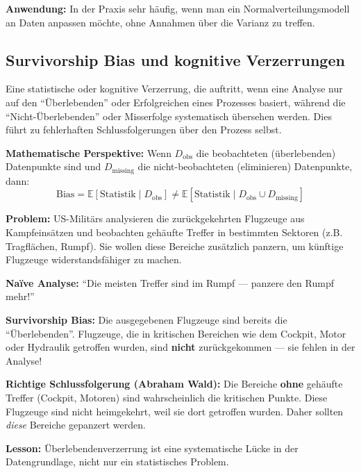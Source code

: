 \textbf{Anwendung:} In der Praxis sehr häufig, wenn man ein Normalverteilungsmodell an Daten anpassen möchte, ohne Annahmen über die Varianz zu treffen.

\newpage




\subsection{Survivorship Bias und kognitive Verzerrungen}

Eine statistische oder kognitive Verzerrung, die auftritt, wenn eine Analyse nur auf den ``Überlebenden'' oder Erfolgreichen eines Prozesses basiert, während die ``Nicht-Überlebenden'' oder Misserfolge systematisch übersehen werden. Dies führt zu fehlerhaften Schlussfolgerungen über den Prozess selbst.

\textbf{Mathematische Perspektive:} Wenn $D_{\text{obs}}$ die beobachteten (überlebenden) Datenpunkte sind und $D_{\text{missing}}$ die nicht-beobachteten (eliminieren) Datenpunkte, dann:
$$\text{Bias} = \mathbb{E}[\text{Statistik} \mid D_{\text{obs}}] \neq \mathbb{E}[\text{Statistik} \mid D_{\text{obs}} \cup D_{\text{missing}}]$$


\textbf{Problem:} US-Militärs analysieren die zurückgekehrten Flugzeuge aus Kampfeinsätzen und beobachten gehäufte Treffer in bestimmten Sektoren (z.B. Tragflächen, Rumpf). Sie wollen diese Bereiche zusätzlich panzern, um künftige Flugzeuge widerstandsfähiger zu machen.

\textbf{Naïve Analyse:} ``Die meisten Treffer sind im Rumpf — panzere den Rumpf mehr!''

\textbf{Survivorship Bias:} Die ausgegebenen Flugzeuge sind bereits die ``Überlebenden''. Flugzeuge, die in kritischen Bereichen wie dem Cockpit, Motor oder Hydraulik getroffen wurden, sind \textbf{nicht} zurückgekommen — sie fehlen in der Analyse!

\textbf{Richtige Schlussfolgerung (Abraham Wald):} Die Bereiche \textbf{ohne} gehäufte Treffer (Cockpit, Motoren) sind wahrscheinlich die kritischen Punkte. Diese Flugzeuge sind nicht heimgekehrt, weil sie dort getroffen wurden. Daher sollten \textit{diese} Bereiche gepanzert werden.

\textbf{Lesson:} Überlebendenverzerrung ist eine systematische Lücke in der Datengrundlage, nicht nur ein statistisches Problem.

